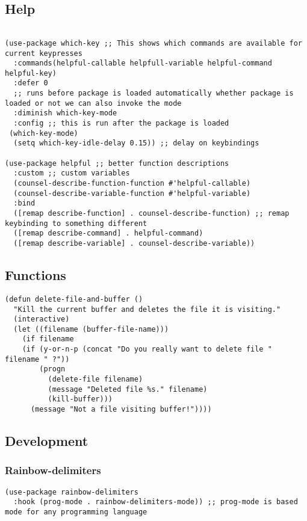 \documentclass[11pt]{article}
\begin{document}
\subsection{Help}
\label{sec:org3206605}
\begin{verbatim}

(use-package which-key ;; This shows which commands are available for current keypresses
  :commands(helpful-callable helpfull-variable helpful-command helpful-key)
  :defer 0
  ;; runs before package is loaded automatically whether package is loaded or not we can also invoke the mode
  :diminish which-key-mode
  :config ;; this is run after the package is loaded
 (which-key-mode)
  (setq which-key-idle-delay 0.15)) ;; delay on keybindings 

(use-package helpful ;; better function descriptions
  :custom ;; custom variables
  (counsel-describe-function-function #'helpful-callable)
  (counsel-describe-variable-function #'helpful-variable)
  :bind
  ([remap describe-function] . counsel-describe-function) ;; remap keybinding to something different
  ([remap describe-command] . helpful-command) 
  ([remap describe-variable] . counsel-describe-variable))

\end{verbatim}

\subsection{Functions}
\label{sec:org26cace7}
\begin{verbatim}
(defun delete-file-and-buffer ()
  "Kill the current buffer and deletes the file it is visiting."
  (interactive)
  (let ((filename (buffer-file-name)))
    (if filename
	(if (y-or-n-p (concat "Do you really want to delete file " filename " ?"))
	    (progn
	      (delete-file filename)
	      (message "Deleted file %s." filename)
	      (kill-buffer)))
      (message "Not a file visiting buffer!"))))

\end{verbatim}

\subsection{Development}
\label{sec:orgbf06511}
\subsubsection{Rainbow-delimiters}
\label{sec:org6ebb379}
\begin{verbatim}
(use-package rainbow-delimiters
  :hook (prog-mode . rainbow-delimiters-mode)) ;; prog-mode is based mode for any programming language
\end{verbatim}
\end{document}
